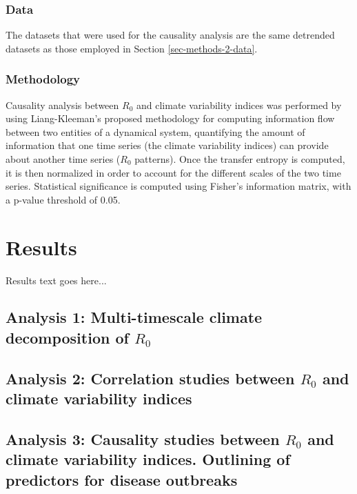 \documentclass[article,10pt,twocolumn]{wlscirep}
\begin{document}
  \subsubsection{Data} \label{sec-methods-3-data}

  The datasets that were used for the causality analysis are the same detrended datasets as those employed in Section \ref{sec-methods-2-data}.

  \subsubsection{Methodology} \label{sec-methods-3-methodology}

  Causality analysis between $R_0$ and climate variability indices was performed by using Liang-Kleeman's proposed methodology for computing information flow between two entities of a dynamical system, quantifying the amount of information that one time series (the climate variability indices) can provide about another time series ($R_0$ patterns). Once the transfer entropy is computed, it is then normalized in order to account for the different scales of the two time series. Statistical significance is computed using Fisher's information matrix, with a p-value threshold of 0.05.


  \section{Results}

  Results text goes here...

  \subsection{Analysis 1: Multi-timescale climate decomposition of $R_0$} \label{sec-results-1}

  \subsection{Analysis 2: Correlation studies between $R_0$ and climate variability indices} \label{sec-results-2} \label{sec-results-2}

  \subsection{Analysis 3: Causality studies between $R_0$ and climate variability indices. Outlining of predictors for disease outbreaks} \label{sec-results-3}
\end{document}
